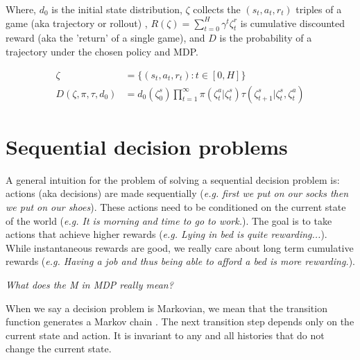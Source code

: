 Where, $d_0$ is the initial state distribution, $\zeta$ collects the $(s_t, a_t, r_t)$ triples of a game (aka trajectory or rollout) \footnotemark[17],
$R(\zeta) =\sum_{t=0}^H \gamma^t \zeta^r_t$ is cumulative discounted reward (aka the 'return' of a single game), and $D$ is the probability of a trajectory under the chosen policy and MDP.


\begin{align}
\zeta &= \{(s_t, a_t, r_t) : t \in [0, H]\} \tag{trajectory} \\
D(\zeta, \pi, \tau, d_0) &= d_0(\zeta^s_0) \prod_{t=1}^{\infty} \pi(\zeta^a_t|\zeta^s_t) \tau(\zeta^s_{t+1}|\zeta^s_t, \zeta^a_t) \tag{p($\zeta$)}
\end{align}


\section{Sequential decision problems}

A general intuition for the problem of solving a sequential decision problem is: actions (aka decisions) are made
sequentially (\textit{e.g. first we put on our socks then we put on our shoes}).
These actions need to be conditioned on the current state of the world (\textit{e.g. It is morning and time to go to work.}).
The goal is to take actions that achieve higher rewards (\textit{e.g. Lying in bed is quite rewarding...}). While instantaneous
rewards are good, we really care about long term cumulative rewards (\textit{e.g. Having a job and thus being able to afford a bed is more rewarding.}).


\begin{displayquote}
  \textit{What does the M in MDP really mean?}
\end{displayquote}

When we say a decision problem is Markovian, we mean that the transition
function generates a Markov chain \cite{Markov2006}. The next transition step depends only
on the current state and action. It is invariant to any and all histories that do not
change the current state. \footnotemark[18]

